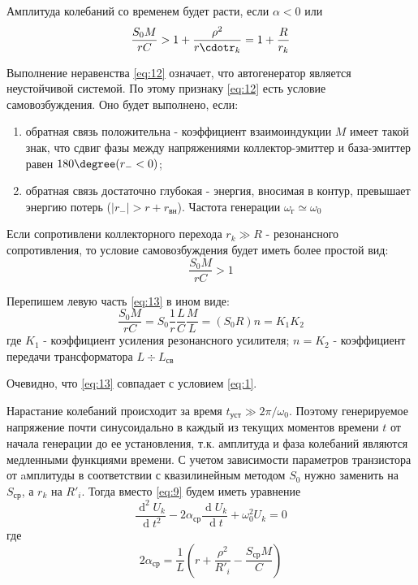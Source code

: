 Амплитуда колебаний со временем будет расти, если $\alpha<0$ или 
\begin{equation}
\frac{S_0M}{rC}>1+\frac{\rho^2}{r\cdotr_k}=1+\frac{R}{r_k}
\label{eq:12}
\end{equation}

Выполнение неравенства \eqref{eq:12} означает, что автогенератор является неустойчивой системой. По этому признаку \eqref{eq:12} есть условие самовозбуждения. Оно будет выполнено, если:
\begin{enumerate}
\item обратная связь положительна - коэффициент взаимоиндукции $M$ имеет такой знак, что сдвиг фазы между напряжениями коллектор-эмиттер и база-эмиттер равен $180\degree(r_{-}<0)$;
\item обратная связь достаточно глубокая - энергия, вносимая в контур, превышает энергию потерь ($|r_{-}|>r+r_\text{вн}$). Частота генерации $\omega_\text{г}\simeq\omega_0$
\end{enumerate}

Если сопротивлени коллекторного перехода $r_k\gg R$ - резонансного сопротивления, то условие самовозбуждения будет иметь более простой вид:
\begin{equation}
\frac{S_0M}{rC}>1
\label{eq:13}
\end{equation}

Перепишем левую часть \eqref{eq:13} в ином виде:
\begin{equation*}
\frac{S_0M}{rC}=S_0\frac{1}{r}\frac{L}{C}\frac{M}{L}=(S_0R)n=K_1K_2
\end{equation*}
где $K_1$ - коэффициент усиления резонансного усилителя; $n=K_2$ - коэффициент передачи трансформатора $L\div L_\text{св}$

Очевидно, что \eqref{eq:13} совпадает с условием \eqref{eq:1}.

Нарастание колебаний происходит за время $t_\text{уст}\gg 2\pi / \omega_0$. Поэтому генерируемое напряжение почти синусоидально в каждый из текущих моментов времени $t$ от начала генерации до ее установления, т.к. амплитуда и фаза колебаний являются медленными функциями времени. С учетом зависимости параметров транзистора от aмплитуды в соответствии с квазилинейным методом $S_0$ нужно заменить на $S_\text{ср}$, а $r_k$ на $R'_i$. Тогда вместо \eqref{eq:9} будем иметь уравнение 
\begin{equation}
\frac{\operatorname d^2U_k}{\operatorname dt^2}-2\alpha_\text{ср} \frac{\operatorname d U_k}{\operatorname dt}+\omega_0^2U_k=0
\label{eq:14}
\end{equation}
где 
\begin{equation}
2\alpha_\text{ср} = \frac{1}{L}(r+\frac{\rho^2}{R'_i}-\frac{S_\text{ср}M}{C})
\label{eq:15}
\end{equation}

